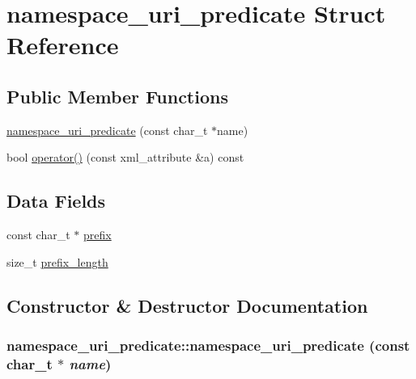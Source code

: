 \hypertarget{structnamespace__uri__predicate}{
\section{namespace\_\-uri\_\-predicate Struct Reference}
\label{structnamespace__uri__predicate}
}
\subsection*{Public Member Functions}
\begin{DoxyCompactItemize}
\item 
\hyperlink{structnamespace__uri__predicate_a25bef9c1e12b0fdc908275ae7ab7c202}{namespace\_\-uri\_\-predicate} (const char\_\-t $\ast$name)
\item 
bool \hyperlink{structnamespace__uri__predicate_ab4580e45d603d3eedfe75fec74210ce1}{operator()} (const xml\_\-attribute \&a) const 
\end{DoxyCompactItemize}
\subsection*{Data Fields}
\begin{DoxyCompactItemize}
\item 
const char\_\-t $\ast$ \hyperlink{structnamespace__uri__predicate_a80a2c051b9e57b8895c28d8fcc32e051}{prefix}
\item 
size\_\-t \hyperlink{structnamespace__uri__predicate_aa48279192e8d48b9c798f5485a2a9170}{prefix\_\-length}
\end{DoxyCompactItemize}


\subsection{Constructor \& Destructor Documentation}
\hypertarget{structnamespace__uri__predicate_a25bef9c1e12b0fdc908275ae7ab7c202}{
\subsubsection[{namespace\_\-uri\_\-predicate}]{\setlength{\rightskip}{0pt plus 5cm}namespace\_\-uri\_\-predicate::namespace\_\-uri\_\-predicate (const char\_\-t $\ast$ {\em name})}}
\label{structnamespace__uri__predicate_a25bef9c1e12b0fdc908275ae7ab7c202}


